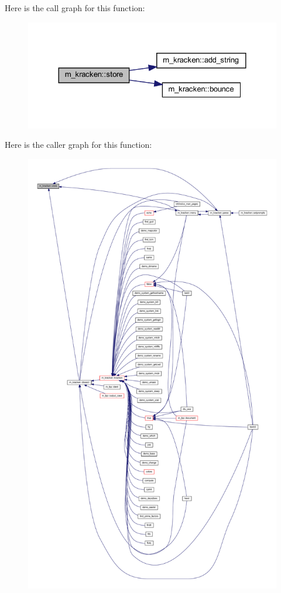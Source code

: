 Here is the call graph for this function\+:
\nopagebreak
\begin{figure}[H]
\begin{center}
\leavevmode
\includegraphics[width=324pt]{namespacem__kracken_a6eb597e3ca7d161933f595788d511fd7_cgraph}
\end{center}
\end{figure}
Here is the caller graph for this function\+:
\nopagebreak
\begin{figure}[H]
\begin{center}
\leavevmode
\includegraphics[height=550pt]{namespacem__kracken_a6eb597e3ca7d161933f595788d511fd7_icgraph}
\end{center}
\end{figure}
\mbox{\label{namespacem__kracken_a9e2129d174220802486cc2dc7e0cc443}} 
